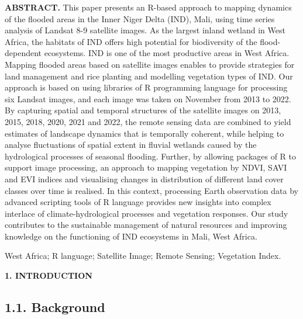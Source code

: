 \documentclass[12pt,a4paper,oneside]{article}
\def \newsection{\vspace{12pt}\textbf}
\def \newpar{\vspace{6pt}}
\begin{document}
{\bf ABSTRACT.} This paper presents an R-based approach to mapping dynamics of the flooded areas in the Inner Niger Delta (IND), Mali, using time series analysis of Landsat 8-9 satellite images. As the largest inland wetland in West Africa, the habitats of IND offers high potential for biodiversity of the flood-dependent ecosystems. IND is one of the most productive areas in West Africa. Mapping flooded areas based on satellite images enables to provide strategies for land management and rice planting and modelling vegetation types of IND. Our approach is based on using libraries of R programming language for processing six Landsat images, and each image was taken on November from 2013 to 2022. By capturing spatial and temporal structures of the satellite images on 2013, 2015, 2018, 2020, 2021 and 2022, the remote sensing data are combined to yield estimates of landscape dynamics that is temporally coherent, while helping to analyse fluctuations of spatial extent in fluvial wetlands caused by the hydrological processes of seasonal flooding. Further, by allowing packages of R to support image processing, an approach to mapping vegetation by NDVI, SAVI and EVI indices and visualising changes in distribution of different land cover classes over time is realised. In this context, processing Earth observation data by advanced scripting tools of R language provides new insights into complex interlace of climate-hydrological processes and vegetation responses. Our study contributes to the sustainable management of natural resources and improving knowledge on the functioning of IND ecosystems in Mali, West Africa. 

\newpar {\bf Keywords:} West Africa; R language; Satellite Image; Remote Sensing; Vegetation Index.


\newsection {1. INTRODUCTION}

\subsection*{1.1. Background}
\end{document}
